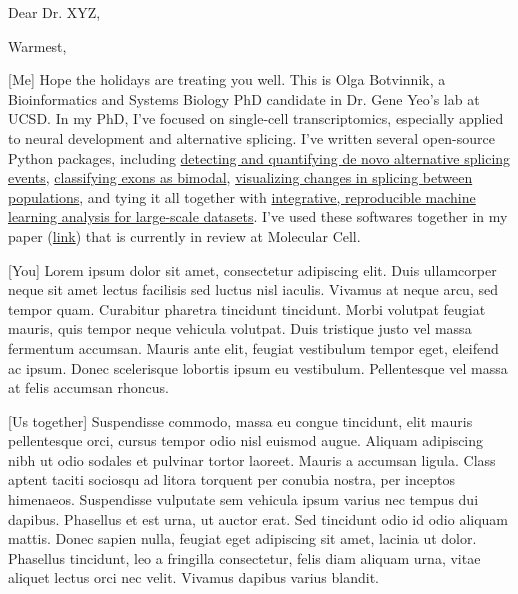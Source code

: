 \date{\today}
\opening{Dear Dr. XYZ,}
\closing{Warmest,}
\makelettertitle

[Me] Hope the holidays are treating you well. This is Olga Botvinnik, a  Bioinformatics and Systems Biology PhD candidate in Dr. Gene Yeo’s lab at UCSD. In my PhD, I’ve focused on single-cell transcriptomics, especially applied to neural development and alternative splicing. I’ve written several open-source Python packages, including \href{https://github.com/YeoLab/outrigger}{detecting and quantifying de novo alternative splicing events}, \href{https://github.com/YeoLab/anchor}{classifying exons as bimodal}, \href{https://github.com/YeoLab/bonvoyage}{visualizing changes in splicing between populations}, and tying it all together with \href{https://github.com/YeoLab/flotilla/}{integrative, reproducible machine learning analysis for large-scale datasets}. I’ve used these softwares together in my paper (\href{https://drive.google.com/file/d/0B44mjlWGbPILeUJVdWMtb0xDWDg/view?usp=sharing}{link}) that is currently in review at Molecular Cell.

[You] Lorem ipsum dolor sit amet, consectetur adipiscing elit. Duis ullamcorper neque sit amet lectus facilisis sed luctus nisl iaculis. Vivamus at neque arcu, sed tempor quam. Curabitur pharetra tincidunt tincidunt. Morbi volutpat feugiat mauris, quis tempor neque vehicula volutpat. Duis tristique justo vel massa fermentum accumsan. Mauris ante elit, feugiat vestibulum tempor eget, eleifend ac ipsum. Donec scelerisque lobortis ipsum eu vestibulum. Pellentesque vel massa at felis accumsan rhoncus.

[Us together] Suspendisse commodo, massa eu congue tincidunt, elit mauris pellentesque orci, cursus tempor odio nisl euismod augue. Aliquam adipiscing nibh ut odio sodales et pulvinar tortor laoreet. Mauris a accumsan ligula. Class aptent taciti sociosqu ad litora torquent per conubia nostra, per inceptos himenaeos. Suspendisse vulputate sem vehicula ipsum varius nec tempus dui dapibus. Phasellus et est urna, ut auctor erat. Sed tincidunt odio id odio aliquam mattis. Donec sapien nulla, feugiat eget adipiscing sit amet, lacinia ut dolor. Phasellus tincidunt, leo a fringilla consectetur, felis diam aliquam urna, vitae aliquet lectus orci nec velit. Vivamus dapibus varius blandit.

